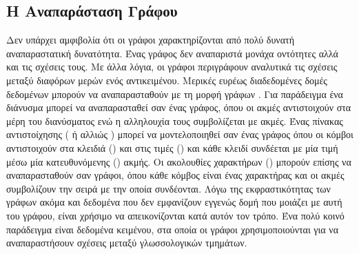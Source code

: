 \subsection{H Αναπαράσταση Γράφου}
Δεν υπάρχει αμφιβολία ότι οι γράφοι χαρακτηρίζονται από πολύ δυνατή αναπαραστατική δυνατότητα.
Ένας γράφος δεν αναπαριστά μονάχα οντότητες αλλά και τις σχέσεις τους.
Με άλλα λόγια, οι γράφοι περιγράφουν αναλυτικά τις σχέσεις μεταξύ διαφόρων μερών ενός αντικειμένου. 
Μερικές ευρέως διαδεδομένες δομές δεδομένων μπορούν να αναπαρασταθούν με τη μορφή γράφων \cite{borgwardt2007}. 
Για παράδειγμα ένα διάνυσμα μπορεί να αναπαρασταθεί σαν ένας γράφος, όπου οι ακμές αντιστοιχούν στα μέρη του διανύσματος ενώ η αλληλουχία τους συμβολίζεται με ακμές.
Ένας πίνακας αντιστοίχησης ( ή αλλιώς ) μπορεί να μοντελοποιηθεί σαν ένας γράφος όπου οι κόμβοι αντιστοιχούν στα κλειδιά () και στις τιμές () και κάθε κλειδί συνδέεται με μία τιμή μέσω μία κατευθυνόμενης () ακμής. 
Οι ακολουθίες χαρακτήρων () μπορούν επίσης να αναπαρασταθούν σαν γράφοι, όπου κάθε κόμβος είναι ένας χαρακτήρας και οι ακμές συμβολίζουν την σειρά με την οποία συνδέονται. 
Λόγω της εκφραστικότητας των γράφων ακόμα και δεδομένα που δεν εμφανίζουν εγγενώς δομή που μοιάζει με αυτή του γράφου, είναι χρήσιμο να απεικονίζονται κατά αυτόν τον τρόπο.
Ένα πολύ κοινό παράδειγμα είναι δεδομένα κειμένου, στα οποία οι γράφοι χρησιμοποιούνται για να αναπαραστήσουν σχέσεις μεταξύ γλωσσολογικών τμημάτων.
